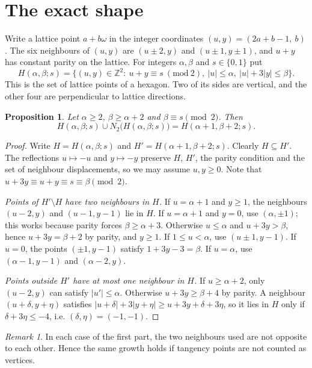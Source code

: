 \documentclass[11pt,a4paper]{amsart}
\newtheorem{proposition}[theorem]{Proposition}
\theoremstyle{definition}
\theoremstyle{remark}
\newtheorem{remark}[theorem]{Remark}
\newcommand{\Z}{\mathbb{Z}}
\begin{document}
\section{The exact shape}

Write a lattice point $a+b\omega$ in the integer coordinates $(u,y)=(2a+b-1,\ b)$. The six neighbours of $(u,y)$ are $(u\pm2,y)$ and $(u\pm1,y\pm1)$, and $u+y$ has constant parity on the lattice. For integers $\alpha,\beta$ and $s\in\{0,1\}$ put
\[
H(\alpha,\beta;s)=\{(u,y)\in\Z^2:\ u+y\equiv s \ (\mathrm{mod}\ 2),\ |u|\le\alpha,\ |u|+3|y|\le\beta\}.
\]
This is the set of lattice points of a hexagon. Two of its sides are vertical, and the other four are perpendicular to lattice directions.

\begin{proposition}\label{prop:hex}
Let $\alpha\ge2$, $\beta\ge\alpha+2$ and $\beta\equiv s\pmod 2$. Then
\[
H(\alpha,\beta;s)\cup N_2\bigl(H(\alpha,\beta;s)\bigr)=H(\alpha+1,\beta+2;s).
\]
\end{proposition}

\begin{proof}
Write $H=H(\alpha,\beta;s)$ and $H'=H(\alpha+1,\beta+2;s)$. Clearly $H\subseteq H'$. The reflections $u\mapsto-u$ and $y\mapsto-y$ preserve $H$, $H'$, the parity condition and the set of neighbour displacements, so we may assume $u,y\ge0$. Note that $u+3y\equiv u+y\equiv s\equiv\beta\pmod2$.

\emph{Points of $H'\setminus H$ have two neighbours in $H$.} If $u=\alpha+1$ and $y\ge1$, the neighbours $(u-2,y)$ and $(u-1,y-1)$ lie in $H$. If $u=\alpha+1$ and $y=0$, use $(\alpha,\pm1)$; this works because parity forces $\beta\ge\alpha+3$. Otherwise $u\le\alpha$ and $u+3y>\beta$, hence $u+3y=\beta+2$ by parity, and $y\ge1$. If $1\le u<\alpha$, use $(u\pm1,y-1)$. If $u=0$, the points $(\pm1,y-1)$ satisfy $1+3y-3=\beta$. If $u=\alpha$, use $(\alpha-1,y-1)$ and $(\alpha-2,y)$.

\emph{Points outside $H'$ have at most one neighbour in $H$.} If $u\ge\alpha+2$, only $(u-2,y)$ can satisfy $|u'|\le\alpha$. Otherwise $u+3y\ge\beta+4$ by parity. A neighbour $(u+\delta,y+\eta)$ satisfies $|u+\delta|+3|y+\eta|\ge u+3y+\delta+3\eta$, so it lies in $H$ only if $\delta+3\eta\le-4$, i.e. $(\delta,\eta)=(-1,-1)$.
\end{proof}

\begin{remark}
In each case of the first part, the two neighbours used are not opposite to each other. Hence the same growth holds if tangency points are not counted as vertices.
\end{remark}
\end{document}
